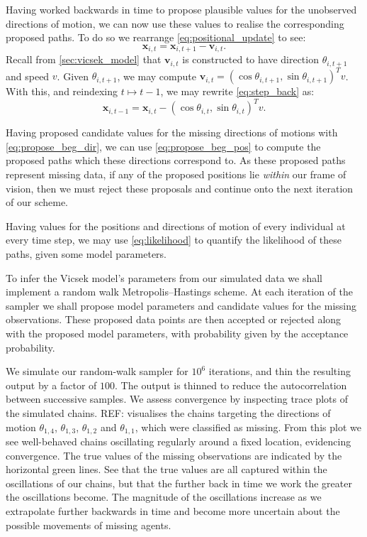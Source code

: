 Having worked backwards in time to propose plausible values for the unobserved
directions of motion, we can now use these values to realise the corresponding
proposed paths. To do so we rearrange \cref{eq:positional_update} to see:
\begin{equation}
  \label{eq:step_back}
  \bm{x}_{i,t} = \bm{x}_{i,t+1} - \bm{v}_{i,t}.
\end{equation}
Recall from \cref{sec:vicsek_model} that $\bm{v}_{i,t}$ is constructed to have
direction $\theta_{i,t+1}$ and speed $v$. Given $\theta_{i,t+1}$, we may
compute $\bm{v}_{i,t} = (\cos\theta_{i,t+1}, \sin\theta_{i,t+1})^Tv$. With
this, and reindexing $t\mapsto t-1$, we may rewrite \cref{eq:step_back} as:
\begin{equation}
  \label{eq:propose_beg_pos}
  \bm{x}_{i,t-1} = \bm{x}_{i,t} - (\cos\theta_{i,t}, \sin\theta_{i,t})^Tv.
\end{equation}

Having proposed candidate values for the missing directions of motions with
\cref{eq:propose_beg_dir}, we can use \cref{eq:propose_beg_pos} to compute the
proposed paths which these directions correspond to. As these proposed
paths represent missing data, if any of the proposed positions lie
\emph{within} our frame of vision, then we must reject these proposals and
continue onto the next iteration of our scheme.

Having values for the positions and directions of motion of every individual at
every time step, we may use \cref{eq:likelihood} to quantify the likelihood of
these paths, given some model parameters.

To infer the Vicsek model's parameters from our simulated data we shall
implement a random walk Metropolis--Hastings scheme. At each iteration of the
sampler we shall propose model parameters and candidate values for the missing
observations. These proposed data points are then accepted or rejected along
with the proposed model parameters, with probability given by the acceptance
probability.

We simulate our random-walk sampler for $10^6$ iterations, and thin the
resulting output by a factor of $100$. The output is thinned to reduce the
autocorrelation between successive samples. We assess convergence by inspecting
trace plots of the simulated chains. REF: visualises the chains targeting the
directions of motion $\theta_{1,4}$, $\theta_{1,3}$, $\theta_{1,2}$ and
$\theta_{1,1}$, which were classified as missing. From this plot we see
well-behaved chains oscillating regularly around a fixed location, evidencing
convergence. The true values of the missing observations are indicated by the
horizontal green lines. See that the true values are all captured within the
oscillations of our chains, but that the further back in time we work the
greater the oscillations become. The magnitude of the oscillations increase as
we extrapolate further backwards in time and become more uncertain about the
possible movements of missing agents.

